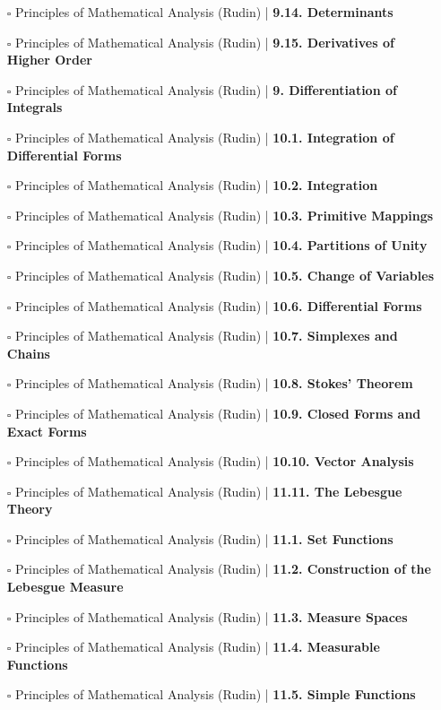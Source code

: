 \documentclass[a4, landscape, 12pt]{article}
\newcommand{\checkbox}{$\square$}%
\begin{document}
\begin{itemize}
{}
\item [\checkbox] Principles of Mathematical Analysis (Rudin)  | \textbf{9.14. Determinants
}
\item [\checkbox] Principles of Mathematical Analysis (Rudin)  | \textbf{9.15. Derivatives of Higher Order
}
\item [\checkbox] Principles of Mathematical Analysis (Rudin)  | \textbf{9. Differentiation of Integrals
}
\item [\checkbox] Principles of Mathematical Analysis (Rudin)  | \textbf{10.1. Integration of Differential Forms
}
\item [\checkbox] Principles of Mathematical Analysis (Rudin)  | \textbf{10.2. Integration
}
\item [\checkbox] Principles of Mathematical Analysis (Rudin)  | \textbf{10.3. Primitive Mappings
}
\item [\checkbox] Principles of Mathematical Analysis (Rudin)  | \textbf{10.4. Partitions of Unity
}
\item [\checkbox] Principles of Mathematical Analysis (Rudin)  | \textbf{10.5. Change of Variables
}
\item [\checkbox] Principles of Mathematical Analysis (Rudin)  | \textbf{10.6. Differential Forms
}
\item [\checkbox] Principles of Mathematical Analysis (Rudin)  | \textbf{10.7. Simplexes and Chains
}
\item [\checkbox] Principles of Mathematical Analysis (Rudin)  | \textbf{10.8. Stokes' Theorem
}
\item [\checkbox] Principles of Mathematical Analysis (Rudin)  | \textbf{10.9. Closed Forms and Exact Forms
}
\item [\checkbox] Principles of Mathematical Analysis (Rudin)  | \textbf{10.10. Vector Analysis
}
\item [\checkbox] Principles of Mathematical Analysis (Rudin)  | \textbf{11.11. The Lebesgue Theory
}
\item [\checkbox] Principles of Mathematical Analysis (Rudin)  | \textbf{11.1. Set Functions
}
\item [\checkbox] Principles of Mathematical Analysis (Rudin)  | \textbf{11.2. Construction of the Lebesgue Measure
}
\item [\checkbox] Principles of Mathematical Analysis (Rudin)  | \textbf{11.3. Measure Spaces
}
\item [\checkbox] Principles of Mathematical Analysis (Rudin)  | \textbf{11.4. Measurable Functions
}
\item [\checkbox] Principles of Mathematical Analysis (Rudin)  | \textbf{11.5. Simple Functions
}
\end{itemize}
\end{document}

